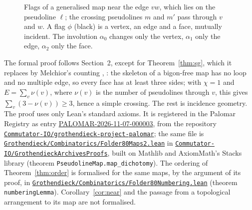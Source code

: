 \documentclass[11pt,a4paper]{amsart}
\theoremstyle{definition}
\theoremstyle{remark}
\begin{document}
\begin{figure}[ht]
\centering
{}
\caption{Flags of a generalised map near the edge $vw$, which lies on the pseudoline $\ell$; the crossing pseudolines $m$ and $m'$ pass through $v$ and $w$. A flag $\phi$ (black) is a vertex, an edge and a face, mutually incident. The involution $\alpha_0$ changes only the vertex, $\alpha_1$ only the edge, $\alpha_2$ only the face.}\label{fig:gmap}
\end{figure}

The formal proof follows Section~2, except for Theorem~\ref{thm:sg}, which it replaces by Melchior's counting \cite{melchior1941}, \cite[Th.~1.3]{bokowskipokora2017}: the skeleton of a bigon-free map has no loop and no multiple edge, so every face has at least three sides; with $\chi = 1$ and $E = \sum_v \nu(v)$, where $\nu(v)$ is the number of pseudolines through $v$, this gives $\sum_v (3 - \nu(v)) \ge 3$, hence a simple crossing. The rest is incidence geometry. The proof uses only Lean's standard axioms. It is registered in the Palomar Registry as entry \href{https://palomar-registry.org/entry.html?id=PALOMAR-2026-11-07-000003}{PALOMAR-2026-11-07-000003}, from the repository \href{https://github.com/Commutator-IO/grothendieck-project-palomar}{\nolinkurl{Commutator-IO/grothendieck-project-palomar}}; the same file is \href{https://github.com/Commutator-IO/GrothendieckArchivesProofs/blob/main/Grothendieck/Combinatorics/Folder80Maps2.lean}{\nolinkurl{Grothendieck/Combinatorics/Folder80Maps2.lean}} in \href{https://github.com/Commutator-IO/GrothendieckArchivesProofs}{\nolinkurl{Commutator-IO/GrothendieckArchivesProofs}}, built on Mathlib and AxiomMath's Stacks library (theorem \nolinkurl{PseudolineMap.map_dichotomy}). The ordering of Theorem~\ref{thm:order} is formalised for the same maps, by the argument of its proof, in \href{https://github.com/Commutator-IO/GrothendieckArchivesProofs/blob/main/Grothendieck/Combinatorics/Folder80Numbering.lean}{\nolinkurl{Grothendieck/Combinatorics/Folder80Numbering.lean}} (theorem \nolinkurl{numberingLemma}). Corollary~\ref{cor:near} and the passage from a topological arrangement to its map are not formalised.
\end{document}
